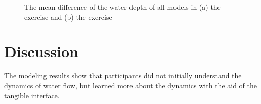 \documentclass{isprs}
\begin{document}
\begin{figure}
\begin{center}
\caption{The mean difference of the water depth of all models in (a) the  exercise and (b) the  exercise}
\label{fig:mean_diff}
\end{center}
\end{figure}




\section{Discussion}\label{sec:discussion}
%
The modeling results show that participants did not initially understand the dynamics of water flow, but learned more about the dynamics with the aid of the tangible interface.
\end{document}
